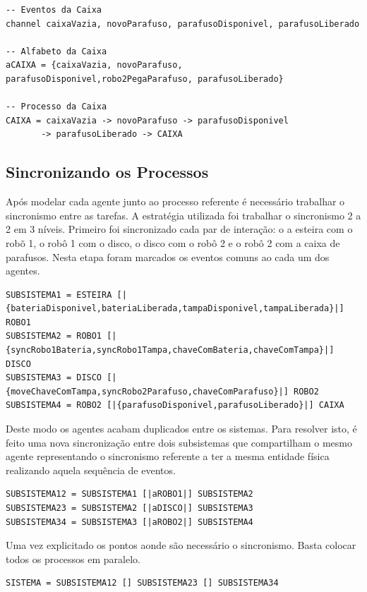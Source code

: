 \documentclass[a4paper,11pt,twocolumns]{article}
\begin{document}
\begin{verbatim}
-- Eventos da Caixa
channel caixaVazia, novoParafuso, parafusoDisponivel, parafusoLiberado

-- Alfabeto da Caixa
aCAIXA = {caixaVazia, novoParafuso, parafusoDisponivel,robo2PegaParafuso, parafusoLiberado}

-- Processo da Caixa
CAIXA = caixaVazia -> novoParafuso -> parafusoDisponivel
       -> parafusoLiberado -> CAIXA
\end{verbatim}


\subsection{Sincronizando os Processos}
Após modelar cada agente junto ao processo referente é necessário trabalhar o sincronismo entre as tarefas. A estratégia utilizada foi trabalhar o sincronismo 2 a 2 em 3 níveis. Primeiro foi sincronizado cada par de interação: o a esteira com o robõ 1, o robô 1 com o disco, o disco com o robô 2 e o robô 2 com a caixa de parafusos. Nesta etapa foram marcados os eventos comuns ao cada um dos agentes.

\begin{verbatim}
SUBSISTEMA1 = ESTEIRA [|{bateriaDisponivel,bateriaLiberada,tampaDisponivel,tampaLiberada}|] ROBO1
SUBSISTEMA2 = ROBO1 [|{syncRobo1Bateria,syncRobo1Tampa,chaveComBateria,chaveComTampa}|] DISCO
SUBSISTEMA3 = DISCO [|{moveChaveComTampa,syncRobo2Parafuso,chaveComParafuso}|] ROBO2
SUBSISTEMA4 = ROBO2 [|{parafusoDisponivel,parafusoLiberado}|] CAIXA
\end{verbatim}

Deste modo os agentes acabam duplicados entre os sistemas. Para resolver isto, é feito uma nova sincronização entre dois subsistemas que compartilham o mesmo agente representando o sincronismo referente a ter a mesma entidade física realizando aquela sequência de eventos.

\begin{verbatim}
SUBSISTEMA12 = SUBSISTEMA1 [|aROBO1|] SUBSISTEMA2
SUBSISTEMA23 = SUBSISTEMA2 [|aDISCO|] SUBSISTEMA3
SUBSISTEMA34 = SUBSISTEMA3 [|aROBO2|] SUBSISTEMA4
\end{verbatim}

Uma vez explicitado os pontos aonde são necessário o sincronismo. Basta colocar todos os processos em paralelo.

\begin{verbatim}
SISTEMA = SUBSISTEMA12 [] SUBSISTEMA23 [] SUBSISTEMA34
\end{verbatim}
\end{document}
